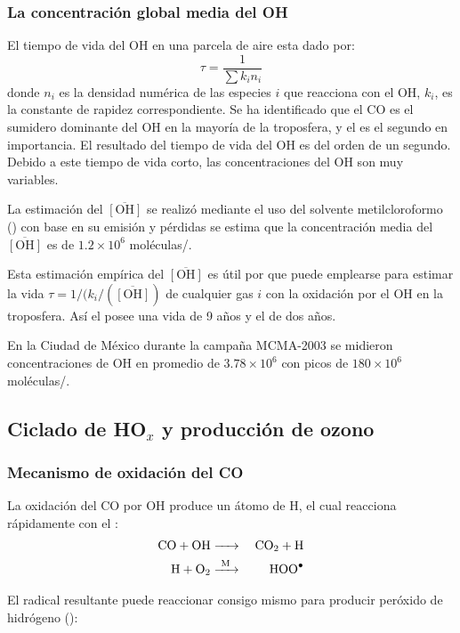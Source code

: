 \subsubsection{La concentraci\'on global media del OH}
El tiempo de vida del OH en una parcela de aire esta dado por:
\begin{equation*}
\tau=\frac{1}{\sum k_in_i}
\end{equation*}
donde $n_i$ es la densidad numérica de las especies $i$ que reacciona con el OH, $k_i$, es la constante de rapidez  correspondiente. Se ha identificado que el CO es el sumidero dominante del OH en la mayoría de la troposfera, y el  es el segundo en importancia. El resultado del tiempo de vida del OH es del orden de un segundo. Debido a este tiempo de vida corto, las concentraciones del OH son muy variables.

La estimación del  $\overline{[\mathrm{OH}]}$ se realizó mediante el uso del solvente metilcloroformo () con base en su emisión y pérdidas se estima que la concentración media del  $\overline{[\mathrm{OH}]}$ es de $1.2\times10^6$ moléculas/\centi\cubic\metre.

Esta estimación empírica del   $\overline{[\mathrm{OH}]}$ es útil por que puede emplearse para estimar la vida  $\tau=1/(k_i/(\overline{[\mathrm{OH}]})$ de cualquier gas $i$ con la oxidación por el OH en la troposfera. Así el  posee una vida de 9 años y el  de dos años.

En la Ciudad de México durante la campaña MCMA-2003 se midieron concentraciones de OH en promedio de  $3.78\times10^6$ con picos de $180\times10^6$ moléculas/\centi\cubic\metre.

\subsection{Ciclado de HO$_x$ y producci\'on de ozono}
\subsubsection{Mecanismo de oxidaci\'on del CO}\label{ciclado}

La oxidación del CO por OH produce un átomo de H, el cual reacciona rápidamente con el :
\begin{eqnarray}
\ce{CO + OH & -> &CO2 + H} \label{OHR4}  \\
\ce{H + O2  & ->[M]  & HOO^.}  \label{OHR6} 
\end{eqnarray}

El radical resultante  puede reaccionar consigo mismo para producir peróxido de hidrógeno ():

